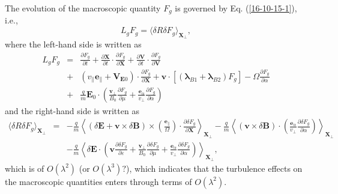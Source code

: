 \documentclass{article}
\newcommand{\tmmathbf}[1]{\ensuremath{\boldsymbol{#1}}}
\begin{document}
The evolution of the macroscopic quantity $F_g$ is governed by Eq.
(\ref{16-10-15-1}), i.e.,
\begin{equation}
  L_g F_g = \langle \delta R \delta F_g \rangle_{\mathbf{X}_{\perp}},
\end{equation}
where the left-hand side is written as
\begin{eqnarray*}
  L_g F_g & = & \frac{\partial F_g}{\partial t} + \frac{\partial
  \mathbf{X}}{\partial t} \cdot \frac{\partial F_g}{\partial \mathbf{X}} +
  \frac{\partial \mathbf{V}}{\partial t} \cdot \frac{\partial F_g}{\partial
  \mathbf{V}}\\
  & + & (v_{\parallel} \mathbf{e}_{\parallel} +\mathbf{V}_{\mathbf{E}0})
  \cdot \frac{\partial F_g}{\partial \mathbf{X}} +\mathbf{v} \cdot
  [(\tmmathbf{\lambda}_{B 1} +\tmmathbf{\lambda}_{B 2}) F_g] - \Omega
  \frac{\partial F_g}{\partial \alpha}\\
  & + & \frac{q}{m} \mathbf{E}_0 \cdot \left( \frac{\mathbf{v}_{\perp}}{B_0} 
  \frac{\partial F_g}{\partial \mu} + \frac{\tmmathbf{e}_{\alpha}}{v_{\perp}} 
  \frac{\partial F_g}{\partial \alpha} \right)
\end{eqnarray*}
and the right-hand side is written as
\begin{eqnarray}
  \langle \delta R \delta F_g \rangle_{\mathbf{X}_{\perp}} & = & - \frac{q}{m}
  \left\langle (\delta \mathbf{E}+\mathbf{v} \times \delta \mathbf{B}) \times
  \left( \frac{\tmmathbf{e}_{\parallel}}{\Omega}  \right) \cdot \frac{\partial
  \delta F_g}{\partial \mathbf{X}} \right\rangle_{\mathbf{X}_{\perp}} -
  \frac{q}{m} \left\langle (\mathbf{v} \times \delta \mathbf{B}) \cdot \left(
  \frac{\tmmathbf{e}_{\alpha}}{v_{\perp}}  \frac{\partial \delta F_g}{\partial
  \alpha} \right) \right\rangle_{\mathbf{X}_{\perp}} \nonumber\\
  &  & - \frac{q}{m} \left\langle \delta \mathbf{E} \cdot \left( \mathbf{v}
  \frac{\partial \delta F_g}{\partial \varepsilon} +
  \frac{\mathbf{v}_{\perp}}{B_0}  \frac{\partial \delta F_g}{\partial \mu} +
  \frac{\tmmathbf{e}_{\alpha}}{v_{\perp}}  \frac{\partial \delta F_g}{\partial
  \alpha} \right) \right\rangle_{\mathbf{X}_{\perp}}, 
\end{eqnarray}
which is of $O (\lambda^2)$ (or $O (\lambda^3) ?$), which indicates that the
turbulence effects on the macroscopic quantities enters through terms of $O
(\lambda^2)$.
\end{document}
